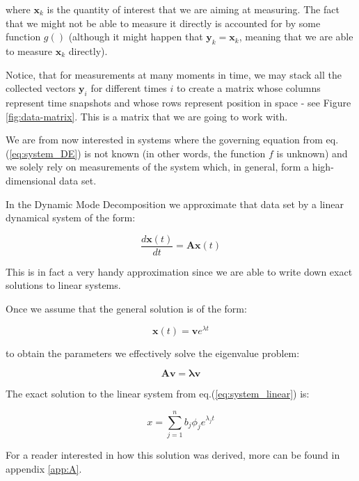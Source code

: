 \documentclass[10pt,twocolumn]{article}
\begin{document}
where $\mathbf{x}_k$ is the quantity of interest that we are aiming at measuring. The fact that we might not be able to measure it directly is accounted for by some function $g()$ (although it might happen that $\mathbf{y}_k = \mathbf{x}_k$, meaning that we are able to measure $\mathbf{x}_k$ directly).

Notice, that for measurements at many moments in time, we may stack all the collected vectors $\mathbf{y}_i$ for different times $i$ to create a matrix whose columns represent time snapshots and whose rows represent position in space - see Figure \ref{fig:data-matrix}. This is a matrix that we are going to work with.

We are from now interested in systems where the governing equation from eq.(\ref{eq:system_DE}) is not known (in other words, the function $f$ is unknown) and we solely rely on measurements of the system which, in general, form a high-dimensional data set.

In the Dynamic Mode Decomposition we approximate that data set by a linear dynamical system of the form:

\begin{equation} \label{eq:system_linear}
\frac{d \mathbf{x}(t)}{dt} = \mathbf{A} \mathbf{x}(t)
\end{equation}

This is in fact a very handy approximation since we are able to write down exact solutions to linear systems.

Once we assume that the general solution is of the form:

\begin{equation} \label{eq:general_solution}
\mathbf{x}(t) = \mathbf{v} e^{\lambda t}
\end{equation}

to obtain the parameters we effectively solve the eigenvalue problem:

\begin{equation} \label{eq:eigenvalue_solution}
\mathbf{A} \mathbf{v} = \mathbf{\lambda} \mathbf{v}
\end{equation}

The exact solution to the linear system from eq.(\ref{eq:system_linear}) is:

\begin{equation} \label{eq:soln_exact}
x = \sum_{j = 1}^{n} b_j \phi_j e^{\lambda_j t}
\end{equation}

For a reader interested in how this solution was derived, more can be found in appendix \ref{app:A}. 
\end{document}
